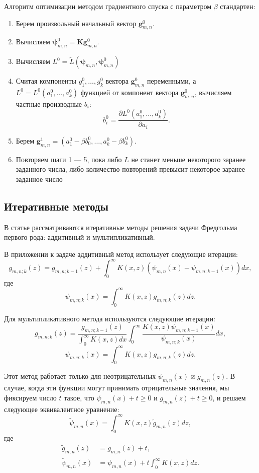 \documentclass[../paper.tex]{subfiles}
\begin{document}
Алгоритм оптимизации методом градиентного спуска с параметром $\beta$ стандартен:
\begin{enumerate}
	\item Берем произвольный начальный вектор $\bm{g}_{m,n}^0$.
	\item Вычисляем $\bm{\psi}_{m,n}^0 = \bm{K}\bm{g}_{m,n}^0$.
	\item Вычисляем $L^0 = \tilde{L}(\bm{\psi}_{m,n}, \bm{\psi}_{m,n}^0)$
	\item Считая компоненты $g_1^0, \dots, g_k^0$ вектора $\bm{g}_{m,n}^0$ переменными, 
		а $L^0 = L^0(a_1^0, \dots, a_k^0)$ функцией от компонент вектора $\bm{g}_{m,n}^0$, вычисляем частные производные $b_i$:
		\[
			b_i^0 = \frac{\partial L^0(a_1^0, \dots, a_k^0)}{\partial a_i}
		.\]
	\item Берем $\bm{g}_{m,n}^1 = (a_1^0 - \beta b_0^0, \dots, a_k^0 - \beta b_k^0)$.
	\item Повторяем шаги 1 --- 5, пока либо $L$ не станет меньше некоторого заранее заданного числа,
		либо количество повторений превысит некоторое заранее заданное число
\end{enumerate}

\subsection{Итеративные методы}
В статье \cite{fredholm-integrals} рассматриваются итеративные методы решения задачи Фредгольма
первого рода: аддитивный и мультипликативный.

В приложении к задаче аддитивный метод использует следующие итерации:
\[
	g_{m,n;k}(z) = g_{m,n;k-1}(z) + \int_0^\infty K(x, z) (\psi_{m,n}(x) - \psi_{m,n;k-1}(x)) dx
,\]
где
\[
	\psi_{m,n;k}(x) = \int_0^\infty K(x, z) g_{m,n;k}(z) dz
.\]

Для мультипликативного метода используются следующие итерации:
\[
	g_{m,n;k}(z) = \frac{g_{m,n;k-1}(z)}{\int_{0}^\infty K(x, z) dx} \int_{0}^\infty \frac{K(x, z) \psi_{m,n;k-1}(x)}{\psi_{m,n;k}(x)} dx
,\]
\[
	\psi_{m,n;k}(x) = \int_0^\infty K(x, z) g_{m,n;k}(z) dz
.\]

Этот метод работает только для неотрицательных $\psi_{m,n}(x)$ и $g_{m,n}(z)$.
В случае, когда эти функции могут принимать отрицательные значения,
мы фиксируем число $t$ такое, что $\psi_{m,n}(x) + t \ge 0$ и $g_{m,n}(z) + t \ge 0$,
и решаем следующее эквивалентное уравнение:
\[
	\tilde{\psi}_{m,n}(x) = \int_0^\infty K(x,z) \tilde{g}_{m,n}(z) dz
,\]
где
\begin{align*}
	\tilde{g}_{m,n}(z)    &= g_{m,n}(z) + t,\\
	\tilde{\psi}_{m,n}(x) &= \psi_{m,n}(x) + t \int_0^\infty K(x,z) dz.
\end{align*}
\end{document}
